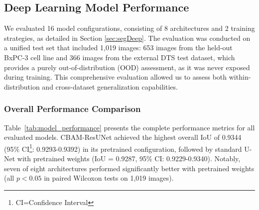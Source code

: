 \documentclass[preprint,12pt]{elsarticle}
\newcommand{\dsDTS}{DTS}
\begin{document}
\subsection{Deep Learning Model Performance}
\label{sec:results-deep}

We evaluated 16 model configurations, consisting of 8 architectures and 2 training strategies, as detailed in Section \ref{sec:segDeep}. The evaluation was conducted on a unified test set that included 1,019 images: 653 images from the held-out BxPC-3 cell line and 366 images from the external \dsDTS{} test dataset, which provides a purely out-of-distribution (OOD) assessment, as it was never exposed during training. This comprehensive evaluation allowed us to assess both within-distribution and cross-dataset generalization capabilities.

\subsubsection{Overall Performance Comparison}

Table~\ref{tab:model_performance} presents the complete performance metrics for all evaluated models. CBAM-ResUNet achieved the highest overall IoU of 0.9344 (95\% CI\footnote{CI=Confidence Interval}: 0.9293-0.9392) in its pretrained configuration, followed by standard U-Net with pretrained weights (IoU = 0.9287, 95\% CI: 0.9229-0.9340). Notably, seven of eight architectures performed significantly better with pretrained weights (all $p < 0.05$ in paired Wilcoxon tests on 1,019 images).
\end{document}
